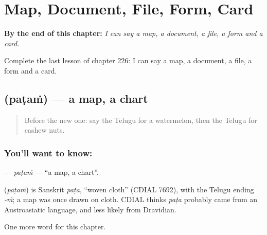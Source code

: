 
\chapter{Map, Document, File, Form, Card}
\label{ch:te-map-document-file-form-card}

\begin{chapteropening}
\textbf{By the end of this chapter:} \emph{I can say a map, a document, a file, a form and a card.}

Complete the last lesson of chapter 226: I can say a map, a document, a file, a form and a card.
\end{chapteropening}

\section[\texorpdfstring{\te{పటం} (paṭaṁ)}{పటం (paṭaṁ)}]{ (paṭaṁ) — a map, a chart}

\label{lesson:TE-C226-patam}



\begin{quote}
Before the new one: say the Telugu for a watermelon, then the Telugu for cashew nuts.
\end{quote}

\subsection*{You'll want to know: }
\textbf{} — \emph{paṭaṁ} — \textquotedblleft{}a map, a chart\textquotedblright{}.

\begin{cousinweb}
\textbf{} (\emph{paṭaṁ}) is Sanskrit \emph{paṭa}, \textquotedblleft{}woven cloth\textquotedblright{} (CDIAL 7692), with the Telugu ending \emph{-ṁ}; a map was once drawn on cloth. CDIAL thinks \emph{paṭa} probably came from an Austroasiatic language, and less likely from Dravidian.
\end{cousinweb}

\begin{grammarlens}[title={What you've built}]
One more word for this chapter.
\end{grammarlens}

